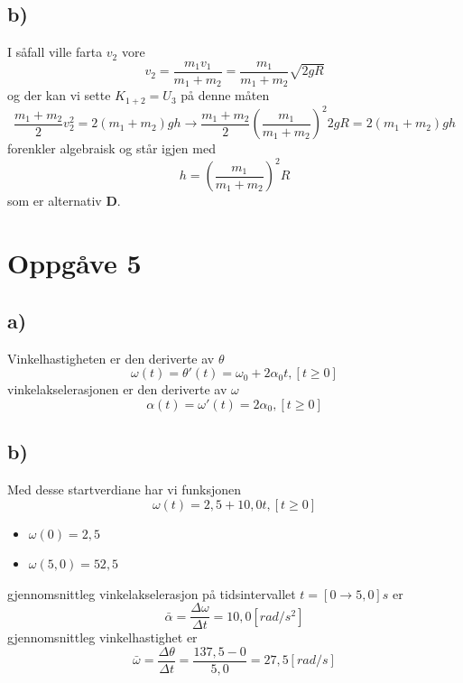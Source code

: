 \documentclass[12pt,a4paper]{article}
\begin{document}
    \subsection*{b)}
    I såfall ville farta $v_2$ vore
    \begin{equation}
      v_2 = \frac{m_1v_1}{m_1+m_2} = \frac{m_1}{m_1+m_2}\sqrt{2gR}
    \end{equation}
    og der kan vi sette $K_{1+2}=U_3$ på denne måten
    \begin{equation}
      \frac{m_1+m_2}{2}v_2^2 = 2(m_1+m_2)gh \rightarrow
      \frac{m_1+m_2}{2} \left( \frac{m_1}{m_1+m_2} \right) ^2 2gR= 2(m_1+m_2)gh
    \end{equation}
    forenkler algebraisk og står igjen med
    \begin{equation}
      h = \left( \frac{m_1}{m_1+m_2} \right) ^2 R
    \end{equation}
    som er alternativ \textbf{D}.

  \section*{Oppgåve 5}
    \subsection*{a)}
    Vinkelhastigheten er den deriverte av $\theta$
    \begin{equation}
      \omega(t) = \theta '(t) = \omega_0 + 2\alpha _0 t, [t \ge 0]
    \end{equation}
    vinkelakselerasjonen er den deriverte av $\omega$
    \begin{equation}
      \alpha(t) = \omega '(t) = 2\alpha _0, [t \ge 0]
    \end{equation}

    \subsection*{b)}
    Med desse startverdiane har vi funksjonen
    \begin{equation}
      \omega(t) = 2,5 + 10,0 t, [t \ge 0]
    \end{equation}
    \begin{itemize}
      \item $\omega(0) = 2,5$
      \item $\omega(5,0) = 52,5$
    \end{itemize}
    gjennomsnittleg vinkelakselerasjon på tidsintervallet $t=[0\rightarrow 5,0]s$ er
    \begin{equation}
      \bar{\alpha} = \frac{\Delta\omega}{\Delta t} = 10,0 [rad/s^2]
    \end{equation}
    gjennomsnittleg vinkelhastighet er
    \begin{equation}
      \bar{\omega} = \frac{\Delta\theta}{\Delta t} = \frac{137,5-0}{5,0} = 27,5[rad/s]
    \end{equation}
\end{document}
